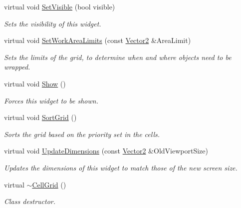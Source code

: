 \begin{DoxyCompactItemize}
virtual void \hyperlink{classphys_1_1UI_1_1CellGrid_abd1b3b422680a8b549c1c897b300da5d}{SetVisible} (bool visible)
\begin{DoxyCompactList}\small\item\em Sets the visibility of this widget. \item\end{DoxyCompactList}\item 
virtual void \hyperlink{classphys_1_1UI_1_1CellGrid_a785a41fd3e38dbd5a58d9a4f72f06a26}{SetWorkAreaLimits} (const \hyperlink{classphys_1_1Vector2}{Vector2} \&AreaLimit)
\begin{DoxyCompactList}\small\item\em Sets the limits of the grid, to determine when and where objects need to be wrapped. \item\end{DoxyCompactList}\item 
\hypertarget{classphys_1_1UI_1_1CellGrid_a772ea260724d009cfe6241e8dac5585b}{
virtual void \hyperlink{classphys_1_1UI_1_1CellGrid_a772ea260724d009cfe6241e8dac5585b}{Show} ()}
\label{classphys_1_1UI_1_1CellGrid_a772ea260724d009cfe6241e8dac5585b}

\begin{DoxyCompactList}\small\item\em Forces this widget to be shown. \item\end{DoxyCompactList}\item 
\hypertarget{classphys_1_1UI_1_1CellGrid_ae539f6b21c3ed84852df37153ae2aebf}{
virtual void \hyperlink{classphys_1_1UI_1_1CellGrid_ae539f6b21c3ed84852df37153ae2aebf}{SortGrid} ()}
\label{classphys_1_1UI_1_1CellGrid_ae539f6b21c3ed84852df37153ae2aebf}

\begin{DoxyCompactList}\small\item\em Sorts the grid based on the priority set in the cells. \item\end{DoxyCompactList}\item 
virtual void \hyperlink{classphys_1_1UI_1_1CellGrid_addbc1338b3b321018cbaf3ff787837e5}{UpdateDimensions} (const \hyperlink{classphys_1_1Vector2}{Vector2} \&OldViewportSize)
\begin{DoxyCompactList}\small\item\em Updates the dimensions of this widget to match those of the new screen size. \item\end{DoxyCompactList}\item 
\hypertarget{classphys_1_1UI_1_1CellGrid_ac1abc38620bbb790afb01443cb2d6853}{
virtual \hyperlink{classphys_1_1UI_1_1CellGrid_ac1abc38620bbb790afb01443cb2d6853}{$\sim$CellGrid} ()}
\label{classphys_1_1UI_1_1CellGrid_ac1abc38620bbb790afb01443cb2d6853}

\begin{DoxyCompactList}\small\item\em Class destructor. \item\end{DoxyCompactList}\end{DoxyCompactItemize}
